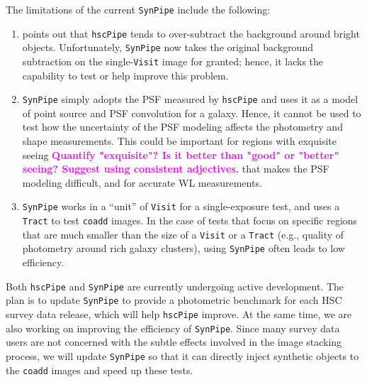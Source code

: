 \documentclass[useamsfonts]{pasj01}
\def\hscpipe{\texttt{hscPipe}}
\def\synpipe{\texttt{SynPipe}}
\def\coadd{\texttt{coadd}}
\def\tract{\texttt{Tract}}
\def\visit{\texttt{Visit}}
\newcommand{\susan}[1]{\textcolor{magenta} {\textbf{#1}}}
\begin{document}
    The limitations of the current \synpipe{} include the following:

    \begin{enumerate}

        \item \citet{HSCDR1} points out that \hscpipe{} tends to over-subtract the
            background around bright objects.
            Unfortunately, \synpipe{} now takes the original background subtraction on
            the single-\visit{} image for granted; hence, it lacks the capability to
            test or help improve this problem.

        \item  \synpipe{} simply adopts the PSF measured by \hscpipe{} and
            uses it as a model of point source and PSF convolution for a galaxy.
            Hence, it cannot be used to test how the uncertainty of the PSF modeling
            affects the photometry and shape measurements.
            This could be important for regions with exquisite seeing \susan{Quantify "exquisite"? Is it better than "good" or "better" seeing? Suggest using consistent adjectives.}  that makes the
            PSF modeling difficult, and for accurate WL measurements.

        \item \synpipe{} works in a ``unit'' of \visit{} for a single-exposure
            test, and uses a \tract{} to test \coadd{} images.
            In the case of tests that focus on specific regions that are much smaller than
            the size of a \visit{} or a \tract{} (e.g., quality of photometry
            around rich galaxy clusters), using \synpipe{} often leads to
            low efficiency.

    \end{enumerate}

    Both \hscpipe{} and \synpipe{} are currently undergoing active development. The plan is to update \synpipe{} to provide a photometric benchmark for
    each HSC survey data release, which will help \hscpipe{} improve.
    At the same time, we are also working on improving the efficiency of \synpipe{}.
    Since many survey data users are not concerned with the subtle effects involved in the image stacking process, we will update \synpipe{} so that it can directly inject synthetic objects to the \coadd{} images and speed up these tests.

\end{document}
